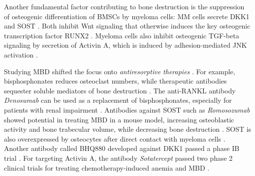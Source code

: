 Another fundamental factor contributing to bone destruction is the suppression of
osteogenic differentiation of \acp{BMSC} by myeloma cells: \ac{MM} cells secrete
\ac{DKK1} and \ac{SOST} \cite{qiangDkk1inducedInhibitionWnt2008,
    zhouDickkopf1KeyRegulator2013, colucciMyelomaCellsSuppress2011}. Both inhibit
\ac{Wnt} signaling that otherwise induces the key osteogenic transcription
factor \ac{RUNX2} \cite{gaurCanonicalWNTSignaling2005}. Myeloma cells also
inhibit osteogenic \ac{TGF-beta} signaling by secretion of Activin A, which is
induced by adhesion-mediated \ac{JNK} activation
\cite{valletActivinPromotesMultiple2010}.

Studying \ac{MBD} shifted the focus onto \emph{antiresorptive %
    therapies}
\cite{hiasaPathogenesisTreatmentMultiple2021,johansenNovelDevelopmentsTreatment2023}.
For example, bisphosphonates  reduces osteoclast
numbers, while therapeutic antibodies sequester soluble mediators of bone
destruction \cite{johansenNovelDevelopmentsTreatment2023}. The anti-RANKL
antibody \emph{Denosumab} can be used as a replacement of bisphosphonates,
especially for patients with renal impairment
\cite{rajeDenosumabZoledronicAcid2018}. Antibodies against \ac{SOST} such as
\emph{Romosozumab}  showed potential in
treating \ac{MBD} in a mouse model, increasing osteoblastic activity and bone
trabecular volume, while decreasing bone destruction
\cite{mcdonaldInhibitingOsteocytespecificProtein2017,
    ngomdirTherapeuticUseAntiSclerostin2023}. \ac{SOST} is also overexpressed by
osteocytes after direct contact with myeloma cells
\cite{delgadocalleDirectCellToCellInteractions2013}. Another antibody called
BHQ880 developed against \ac{DKK1} passed a phase IB trial
\cite{iyerPhaseIBMulticentre2014}. For targeting Activin A, the antibody
\emph{Sotatercept} passed two phase 2 clinical trials for treating
chemotherapy-induced anemia and \ac{MBD}
\cite{raftopoulosSotaterceptACE011Treatment2016,abdulkadyrovSotaterceptPatientsOsteolytic2014}.

